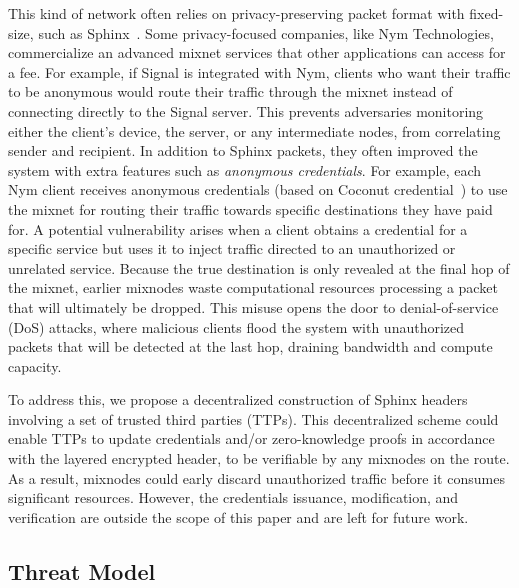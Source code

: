 This kind of network often relies on privacy-preserving packet format with fixed-size, such as Sphinx~\cite{sphinx}.
Some privacy-focused companies, like Nym Technologies, commercialize an advanced mixnet services that other applications can access for a fee.
For example, if Signal is integrated with Nym, clients who want their traffic to be anonymous would route their traffic through the mixnet instead of connecting directly to the Signal server. 
This prevents adversaries monitoring either the client's device, the server, or any intermediate nodes, from correlating sender and recipient.
In addition to Sphinx packets, they often improved the system with extra features such as \textit{anonymous credentials}.
For example, each Nym client receives anonymous credentials (based on Coconut credential~\cite{coconut}) to use the mixnet for routing their traffic towards specific destinations they have paid for.
A potential vulnerability arises when a client obtains a credential for a specific service but uses it to inject traffic directed to an unauthorized or unrelated service. 
Because the true destination is only revealed at the final hop of the mixnet, earlier mixnodes waste computational resources processing a packet that will ultimately be dropped. 
This misuse opens the door to denial-of-service (DoS) attacks, where malicious clients flood the system with unauthorized packets that will be detected at the last hop, draining bandwidth and compute capacity.


To address this, we propose a decentralized construction of Sphinx headers involving a set of trusted third parties (TTPs). 
This decentralized scheme could enable TTPs to update credentials and/or zero-knowledge proofs in accordance with the layered encrypted header, to be verifiable by any mixnodes on the route.  
As a result, mixnodes could early discard unauthorized traffic before it consumes significant resources.
However, the credentials issuance, modification, and verification are outside the scope of this paper and are left for future work.


\subsection{Threat Model} 

